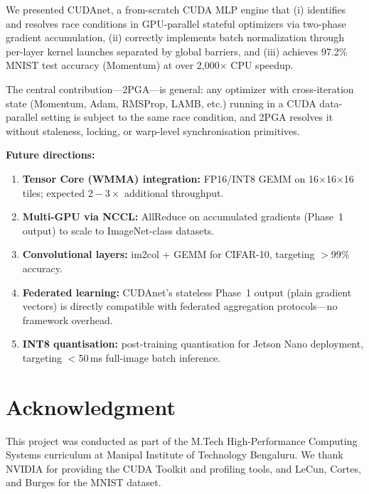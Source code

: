 \documentclass[conference]{IEEEtran}
\begin{document}
We presented CUDAnet, a from-scratch CUDA MLP engine that (i) identifies and resolves race conditions in GPU-parallel stateful optimizers via two-phase gradient accumulation, (ii) correctly implements batch normalization through per-layer kernel launches separated by global barriers, and (iii) achieves 97.2\% MNIST test accuracy (Momentum) at over 2{,}000$\times$ CPU speedup.

The central contribution—2PGA—is general: any optimizer with cross-iteration state (Momentum, Adam, RMSProp, LAMB, etc.) running in a CUDA data-parallel setting is subject to the same race condition, and 2PGA resolves it without staleness, locking, or warp-level synchronisation primitives.

\textbf{Future directions:}
\begin{enumerate}
  \item \textbf{Tensor Core (WMMA) integration:} FP16/INT8 GEMM on 16$\times$16$\times$16 tiles; expected $2\!-\!3\times$ additional throughput.
  \item \textbf{Multi-GPU via NCCL:} AllReduce on accumulated gradients (Phase~1 output) to scale to ImageNet-class datasets.
  \item \textbf{Convolutional layers:} im2col + GEMM for CIFAR-10, targeting $>$99\% accuracy.
  \item \textbf{Federated learning:} CUDAnet's stateless Phase~1 output (plain gradient vectors) is directly compatible with federated aggregation protocols—no framework overhead.
  \item \textbf{INT8 quantisation:} post-training quantisation for Jetson Nano deployment, targeting $<$50\,ms full-image batch inference.
\end{enumerate}

\section*{Acknowledgment}

This project was conducted as part of the M.Tech High-Performance Computing Systems curriculum at Manipal Institute of Technology Bengaluru. We thank NVIDIA for providing the CUDA Toolkit and profiling tools, and LeCun, Cortes, and Burges for the MNIST dataset.
\end{document}
